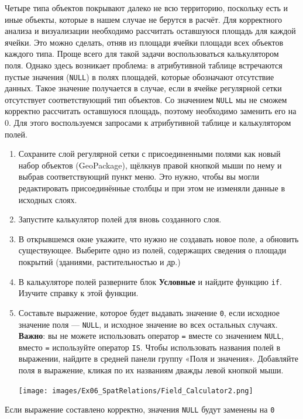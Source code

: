 \documentclass[
  12pt,
]{book}
\begin{document}
Четыре типа объектов покрывают далеко не всю территорию, поскольку есть и иные объекты, которые в нашем случае не берутся в расчёт. Для корректного анализа и визуализации необходимо рассчитать оставшуюся площадь для каждой ячейки. Это можно сделать, отняв из площади ячейки площади всех объектов каждого типа. Проще всего для такой задачи воспользоваться калькулятором поля. Однако здесь возникает проблема: в атрибутивной таблице встречаются пустые значения (\texttt{NULL}) в полях площадей, которые обозначают отсутствие данных. Такое значение получается в случае, если в ячейке регулярной сетки отсутствует соответствующий тип объектов. Со значением \texttt{NULL} мы не сможем корректно рассчитать оставшуюся площадь, поэтому необходимо заменить его на \(0\). Для этого воспользуемся запросами к атрибутивной таблице и калькулятором полей.

\begin{enumerate}
\def\labelenumi{\arabic{enumi}.}
\item
  Сохраните слой регулярной сетки с присоединенными полями как новый набор объектов (GeoPackage), щёлкнув правой кнопкой мыши по нему и выбрав соответствующий пункт меню. Это нужно, чтобы вы могли редактировать присоединённые столбцы и при этом не изменяли данные в исходных слоях.
\item
  Запустите калькулятор полей для вновь созданного слоя.
\item
  В открывшемся окне укажите, что нужно не создавать новое поле, а обновить существующее. Выберите одно из полей, содержащих сведения о площади покрытий (зданиями, растительностью и др.)
\item
  В калькуляторе полей разверните блок \textbf{Условные} и найдите функцию \texttt{if}. Изучите справку к этой функции.
\item
  Составьте выражение, которое будет выдавать значение \texttt{0}, если исходное значение поля --- \texttt{NULL}, и исходное значение во всех остальных случаях. \textbf{Важно}: вы не можете использовать оператор \texttt{=} вместе со значением \texttt{NULL}, вместо \texttt{=} используйте оператор \texttt{IS}. Чтобы использовать названия полей в выражении, найдите в средней панели группу «Поля и значения». Добавляйте поля в выражение, кликая по их названиям дважды левой кнопкой мыши.

  \texttt{[image: images/Ex06\_SpatRelations/Field\_Calculator2.png]}
\end{enumerate}

Если выражение составлено корректно, значения \texttt{NULL} будут заменены на \texttt{0}
\end{document}
